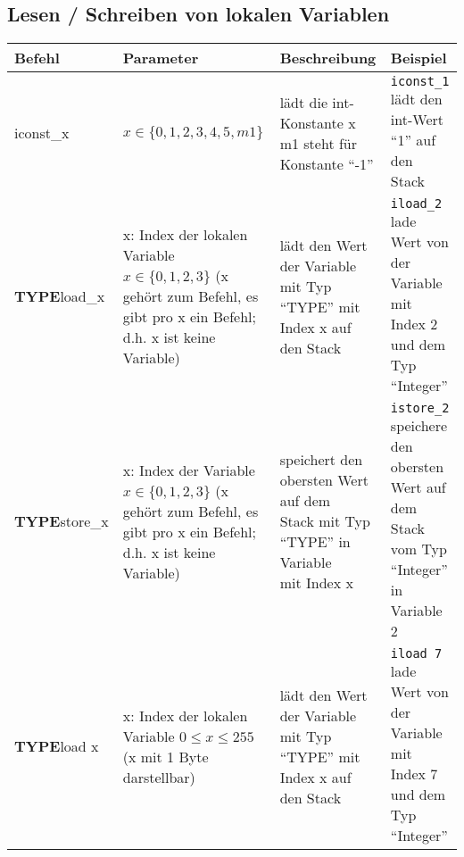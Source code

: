 \subsection{Lesen / Schreiben von lokalen Variablen}
\begin{table}[H]
	\centering
	\label{my-label}
	\begin{tabular}{l|l|l|l}
		Befehl & Parameter & Beschreibung & Beispiel \\ \hline
		iconst\_x	&	\multlineTable{$x\in \{0,1,2,3,4,5,m1\}$\\ } & \multlineTable{lädt die int-Konstante x\\ m1 steht für Konstante \enquote{-1}} & \multlineTable{\texttt{iconst\_1}\\ lädt den int-Wert \enquote{1} auf den Stack} \\ \hline
		\textbf{TYPE}load\_x	& 	\multlineTable{x: Index der lokalen\\ Variable $x\in \{ 0,1,2,3 \}$\\ (x gehört zum Befehl,\\ es gibt pro x ein Befehl;\\ d.h. x ist keine Variable) }	&	\multlineTable{lädt den Wert der Variable mit Typ\\ \enquote{TYPE} mit Index x auf den Stack} 	& \multlineTable{\texttt{iload\_2}\\ lade Wert von der Variable mit\\ Index 2 und dem Typ \enquote{Integer}}      \\ \hline
		
		\textbf{TYPE}store\_x	&	\multlineTable{x: Index der Variable\\ $x\in \{ 0,1,2,3 \}$\\ (x gehört zum Befehl,\\ es gibt pro x ein Befehl;\\ d.h. x ist keine Variable) }	&	\multlineTable{speichert den obersten Wert auf dem\\ Stack mit Typ \enquote{TYPE} in Variable\\ mit Index x}	& \multlineTable{\texttt{istore\_2}\\ speichere den obersten Wert auf\\ dem Stack vom Typ \enquote{Integer}\\ in Variable 2 }	\\ \hline
		
		\textbf{TYPE}load x	& \multlineTable{x: Index der lokalen\\ Variable $0 \leq x \leq 255$\\ (x mit 1 Byte darstellbar) }	&	\multlineTable{lädt den Wert der Variable mit Typ\\ \enquote{TYPE} mit Index x auf den Stack} 	& \multlineTable{\texttt{iload 7}\\ lade Wert von der Variable mit\\ Index 7 und dem Typ \enquote{Integer}}      \\ \hline
		

\end{tabular}
\end{table}
